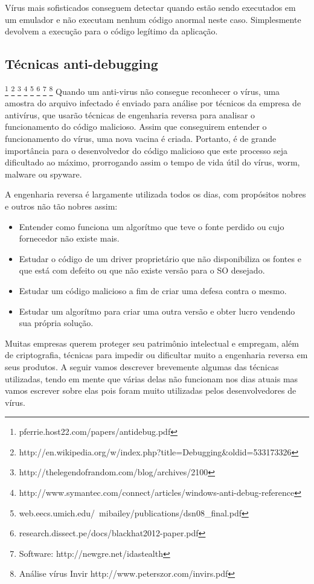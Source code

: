 Vírus mais sofisticados conseguem detectar quando estão sendo executados em um emulador e não executam nenhum código anormal neste caso. Simplesmente devolvem a execução para o código legítimo da aplicação.

\subsection{Técnicas anti-debugging} 
\footnote{pferrie.host22.com/papers/antidebug.pdf}
\footnote{http://en.wikipedia.org/w/index.php?title=Debugging\&oldid=533173326} 
\footnote{http://thelegendofrandom.com/blog/archives/2100} 
\footnote{http://www.symantec.com/connect/articles/windows-anti-debug-reference}
\footnote{web.eecs.umich.edu/~mibailey/publications/dsn08\_final.pdf} 
\footnote{research.dissect.pe/docs/blackhat2012-paper.pdf}
\footnote{Software: http://newgre.net/idastealth}
\footnote{Análise vírus Invir http://www.peterszor.com/invirs.pdf}
Quando um anti-virus não consegue reconhecer o vírus, uma amostra do arquivo infectado é enviado para análise por técnicos da empresa de antivírus, que usarão técnicas de engenharia reversa para analisar o funcionamento do código malicioso. Assim que conseguirem entender o funcionamento do vírus, uma nova vacina é criada. Portanto, é de grande importância para o desenvolvedor do código malicioso que este processo seja dificultado ao máximo, prorrogando assim o tempo de vida útil do vírus, worm, malware ou spyware. 

A engenharia reversa é largamente utilizada todos os dias, com propósitos nobres e outros não tão nobres assim:
\begin{itemize}
 \item Entender como funciona um algorítmo que teve o fonte perdido ou cujo fornecedor não existe mais.
 \item Estudar o código de um driver proprietário que não disponibiliza os fontes e que está com defeito ou que não existe versão para o SO desejado. 
 \item Estudar um código malicioso a fim de criar uma defesa contra o mesmo.
 \item Estudar um algorítmo para criar uma outra versão e obter lucro vendendo sua própria solução.
\end{itemize}

Muitas empresas querem proteger seu patrimônio intelectual e empregam, além de criptografia, técnicas para impedir ou dificultar muito a engenharia reversa em seus produtos. A seguir vamos descrever brevemente algumas das técnicas utilizadas, tendo em mente que várias delas não funcionam nos dias atuais mas vamos escrever sobre elas pois foram muito utilizadas pelos desenvolvedores de vírus. 

